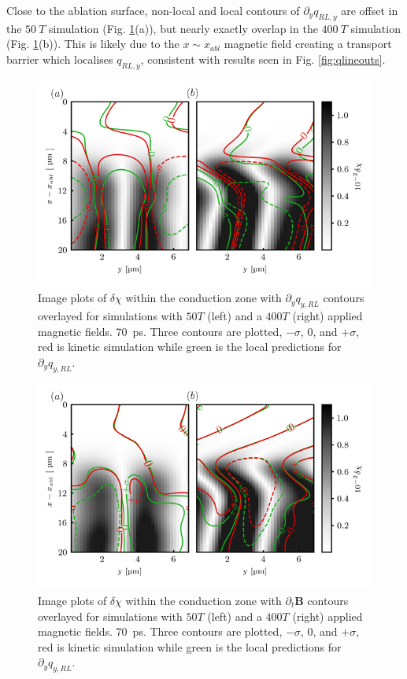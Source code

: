 \documentclass[aip,reprint]{revtex4-1}
\begin{document}
Close to the ablation surface, non-local and local contours of $\partial_y q_{RL,y}$ are offset in the $\SI{50}{T}$ simulation (Fig. \ref{fig:qrl_contour}(a)), but nearly exactly overlap in the $\SI{400}{T}$ simulation (Fig. \ref{fig:qrl_contour}(b)). This is likely due to the $x\sim x_{abl}$ magnetic field creating a transport barrier which localises $q_{RL,y}$, consistent with results seen in Fig. \ref{fig:qlineouts}.

\begin{figure}
	\includegraphics[width=1.0\columnwidth]{pics/plot_dqy_qRL_contour_11_LT1_100p_green.png}
	\caption{\label{fig:qrl_contour} Image plots of $\delta \chi$ within the conduction zone with $\partial_y q_{y,RL}$ contours overlayed for simulations with $\si{50}{T}$ (left) and a $\si{400}{T}$ (right) applied magnetic fields.  \SI{70}{ps}. Three contours are plotted, $-\sigma$, $0$, and $+\sigma$, red is kinetic simulation while green is the local predictions for $\partial_y q_{y,RL}$. }
\end{figure}

\begin{figure}
	\includegraphics[width=1.0\columnwidth]{pics/plot_dqy_bier_contour_11_LT1_100p_green.png}
	\caption{\label{fig:bier_contour} Image plots of $\delta \chi$ within the conduction zone with $\partial_t \mathbf{B}$ contours overlayed for simulations with $\si{50}{T}$ (left) and a $\si{400}{T}$ (right) applied magnetic fields.  \SI{70}{ps}. Three contours are plotted, $-\sigma$, $0$, and $+\sigma$, red is kinetic simulation while green is the local predictions for $\partial_y q_{y,RL}$. }
\end{figure}
\end{document}
